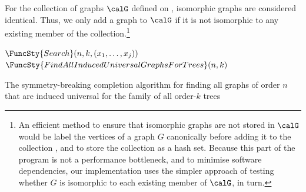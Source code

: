 For the collection of graphs $\calG$ defined on ,
isomorphic graphs are considered identical.  Thus, we only add a graph
to $\calG$ if it is not isomorphic to any existing member of the
collection.\footnote{An efficient method to ensure that isomorphic
graphs are not stored in $\calG$ would be label the vertices
of a graph $G$ canonically before adding it to the collection
\cite{DBLP:journals/jsc/McKayP14}, and to store the collection as a
hash set.  Because this part of the program is not a performance
bottleneck, and to minimise software dependencies, our implementation
uses the simpler approach of testing whether $G$ is isomorphic
to each existing member of $\calG$, in turn.}

\begin{algorithm}[h!]
\DontPrintSemicolon
\nl $\FuncSty{Search}(n,k,(x_1, \dots, x_j))$ \;
\nl {}
\nl {}
\nl {}
\medskip
\nl $\FuncSty{FindAllInducedUniversalGraphsForTrees}(n,k)$ \;
\nl {}
\nl {}
\nl {}
\caption{The symmetry-breaking completion algorithm for finding all graphs of order $n$
    that are induced universal for the family of all order-$k$ trees}
\label{alg:completion}
\end{algorithm}


